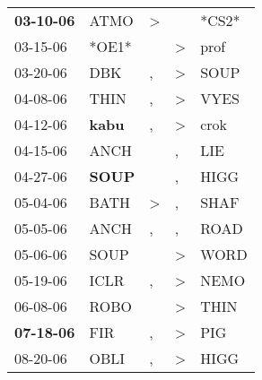 \begin{supertabular}{p{0.07\textwidth}p{0.06\textwidth}p{0.02\textwidth}p{0.02\textwidth}p{0.06\textwidth}}
 \textbf{03-10-06\textsuperscript{}} &           ATMO\textsuperscript{} &  \textgreater &                  &                            *CS2* \\
          03-15-06\textsuperscript{} &                            *OE1* &               &     \textgreater &           prof\textsuperscript{} \\
          03-20-06\textsuperscript{} &            DBK\textsuperscript{} &             , &     \textgreater &           SOUP\textsuperscript{} \\
          04-08-06\textsuperscript{} &           THIN\textsuperscript{} &             , &     \textgreater &           VYES\textsuperscript{} \\
          04-12-06\textsuperscript{} &  \textbf{kabu\textsuperscript{}} &             , &     \textgreater &           crok\textsuperscript{} \\
          04-15-06\textsuperscript{} &           ANCH\textsuperscript{} &               &                , &            LIE\textsuperscript{} \\
          04-27-06\textsuperscript{} &  \textbf{SOUP\textsuperscript{}} &               &                , &           HIGG\textsuperscript{} \\
          05-04-06\textsuperscript{} &           BATH\textsuperscript{} &  \textgreater &                , &           SHAF\textsuperscript{} \\
          05-05-06\textsuperscript{} &           ANCH\textsuperscript{} &             , &                , &           ROAD\textsuperscript{} \\
          05-06-06\textsuperscript{} &           SOUP\textsuperscript{} &               &     \textgreater &           WORD\textsuperscript{} \\
          05-19-06\textsuperscript{} &           ICLR\textsuperscript{} &             , &     \textgreater &           NEMO\textsuperscript{} \\
          06-08-06\textsuperscript{} &           ROBO\textsuperscript{} &               &     \textgreater &           THIN\textsuperscript{} \\
 \textbf{07-18-06\textsuperscript{}} &            FIR\textsuperscript{} &             , &     \textgreater &            PIG\textsuperscript{} \\
          08-20-06\textsuperscript{} &           OBLI\textsuperscript{} &             , &     \textgreater &           HIGG\textsuperscript{} \\

\end{supertabular}
